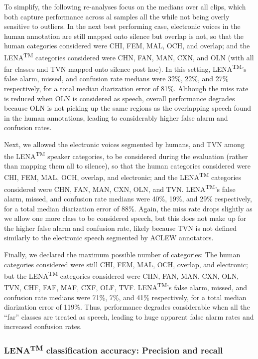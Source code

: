 \documentclass[english,table,man,floatsintext]{apa6}
\begin{document}
To simplify, the following re-analyses focus on the medians over all clips, which both capture performance across al samples all the while not being overly sensitive to outliers. In the next best performing case, electronic voices in the human annotation are still mapped onto silence but overlap is not, so that the human categories considered were CHI, FEM, MAL, OCH, and overlap; and the LENA\textsuperscript{TM} categories considered were CHN, FAN, MAN, CXN, and OLN (with all far classes and TVN mapped onto silence post hoc). In this setting, LENA\textsuperscript{TM}'s false alarm, missed, and confusion rate medians were 32\%, 22\%, and 27\% respectively, for a total median diarization error of 81\%. Although the miss rate is reduced when OLN is considered as speech, overall performance degrades because OLN is not picking up the same regions as the overlapping speech found in the human annotations, leading to considerably higher false alarm and confusion rates.

Next, we allowed the electronic voices segmented by humans, and TVN among the LENA\textsuperscript{TM} speaker categories, to be considered during the evaluation (rather than mapping them all to silence), so that the human categories considered were CHI, FEM, MAL, OCH, overlap, and electronic; and the LENA\textsuperscript{TM} categories considered were CHN, FAN, MAN, CXN, OLN, and TVN. LENA\textsuperscript{TM}'s false alarm, missed, and confusion rate medians were 40\%, 19\%, and 29\% respectively, for a total median diarization error of 88\%. Again, the miss rate drops slightly as we allow one more class to be considered speech, but this does not make up for the higher false alarm and confusion rate, likely because TVN is not defined similarly to the electronic speech segmented by ACLEW annotators.

Finally, we declared the maximum possible number of categories: The human categories considered were still CHI, FEM, MAL, OCH, overlap, and electronic; but the LENA\textsuperscript{TM} categories considered were CHN, FAN, MAN, CXN, OLN, TVN, CHF, FAF, MAF, CXF, OLF, TVF. LENA\textsuperscript{TM}'s false alarm, missed, and confusion rate medians were 71\%, 7\%, and 41\% respectively, for a total median diarization error of 119\%. Thus, performance degrades considerable when all the \enquote{far} classes are treated as speech, leading to huge apparent false alarm rates and increased confusion rates.

\hypertarget{lenatm-classification-accuracy-precision-and-recall}{%
\subsubsection{\texorpdfstring{LENA\textsuperscript{TM} classification accuracy: Precision and recall}{LENATM classification accuracy: Precision and recall}}\label{lenatm-classification-accuracy-precision-and-recall}}
\end{document}
